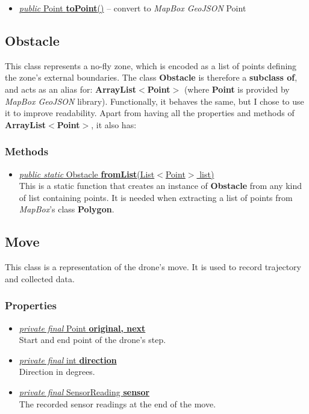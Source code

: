\documentclass{article}
\newcommand{\method}[4]{\underline{\textit{#1} #2 \textbf{#3}(#4)}}
\newcommand{\prop}[3]{\underline{\textit{#1} #2 \textbf{#3}}}
\begin{document}
\begin{itemize}
\item \method{public}{Point}{toPoint}{} -- convert to \textit{MapBox GeoJSON} Point
\end{itemize}

\subsection{Obstacle}
\label{cls:Obstacle}

This class represents a no-fly zone, which is encoded as a list of points defining the zone's external boundaries. The class \textbf{Obstacle} is therefore a \textbf{subclass of}, and acts as an alias for: \textbf{ArrayList$<$Point$>$} (where \textbf{Point} is provided by \textit{MapBox GeoJSON} library). Functionally, it behaves the same, but I chose to use it to improve readability. Apart from having all the properties and methods of \textbf{ArrayList$<$Point$>$}, it also has:

\subsubsection*{Methods}

\begin{itemize}
\item \method{public static}{Obstacle}{fromList}{List$<$Point$>$ list} \\
  This is a static function that creates an instance of \textbf{Obstacle} from any kind of list containing points. It is needed when extracting a list of points from \textit{MapBox}'s class \textbf{Polygon}.
\end{itemize}

\subsection{Move}
\label{cls:Move}

This class is a representation of the drone's move. It is used to record trajectory and collected data.

\subsubsection*{Properties}

\begin{itemize}
\item \prop{private final}{Point}{original, next} \\
  Start and end point of the drone's step.
\item \prop{private final}{int}{direction} \\
  Direction in degrees.
\item \prop{private final}{SensorReading}{sensor} \\
  The recorded sensor readings at the end of the move.
\end{itemize}
\end{document}
